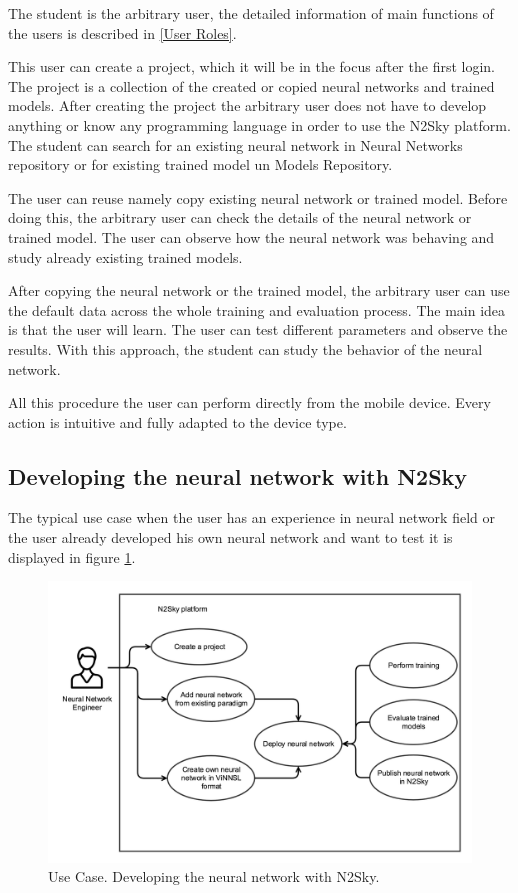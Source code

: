 The student is the arbitrary user, the detailed information of main functions of the users is described in \autoref{User Roles}. 

This user can create a project, which it will be in the focus after the first login. The project is a collection of the created or copied neural networks and trained models. After creating the project the arbitrary user does not have to develop anything or know any programming language in order to use the N2Sky platform. The student can search for an existing neural network in Neural Networks repository or for existing trained model un Models Repository. 

The user can reuse namely copy existing neural network or trained model. Before doing this, the arbitrary user can check the details of the neural network or trained model.  
The user can observe how the neural network was behaving and study already existing trained models. 

After copying the neural network or the trained model, the arbitrary user can use the default data across the whole training and evaluation process. The main idea is that the user will learn. The user can test different parameters and observe the results. With this approach, the student can study the behavior of the neural network.

All this procedure the user can perform directly from the mobile device.  Every action is intuitive and fully adapted to the device type.

\subsection{Developing the neural network with N2Sky}\label{Developing the neural network with N2Sky}

The typical use case when the user has an experience in neural network field or the user already developed his own neural network and want to test it is displayed in figure \ref{fig:user_case_engin}.

\begin{figure}[htbp]
\begin{center}
  \includegraphics[width=\linewidth]{components/usecase/img/user_case_engin.png}
  \caption{Use Case. Developing the neural network with N2Sky.}
  \label{fig:user_case_engin}
\end{center}
\end{figure} 

